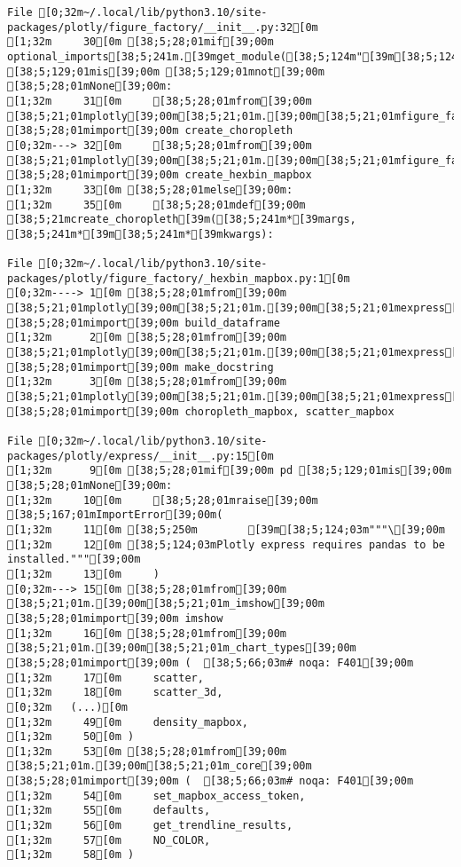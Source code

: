 \documentclass[
  a4paper,
  portrait]{book}
\begin{document}
\begin{verbatim}
File [0;32m~/.local/lib/python3.10/site-packages/plotly/figure_factory/__init__.py:32[0m
[1;32m     30[0m [38;5;28;01mif[39;00m optional_imports[38;5;241m.[39mget_module([38;5;124m"[39m[38;5;124mpandas[39m[38;5;124m"[39m) [38;5;129;01mis[39;00m [38;5;129;01mnot[39;00m [38;5;28;01mNone[39;00m:
[1;32m     31[0m     [38;5;28;01mfrom[39;00m [38;5;21;01mplotly[39;00m[38;5;21;01m.[39;00m[38;5;21;01mfigure_factory[39;00m[38;5;21;01m.[39;00m[38;5;21;01m_county_choropleth[39;00m [38;5;28;01mimport[39;00m create_choropleth
[0;32m---> 32[0m     [38;5;28;01mfrom[39;00m [38;5;21;01mplotly[39;00m[38;5;21;01m.[39;00m[38;5;21;01mfigure_factory[39;00m[38;5;21;01m.[39;00m[38;5;21;01m_hexbin_mapbox[39;00m [38;5;28;01mimport[39;00m create_hexbin_mapbox
[1;32m     33[0m [38;5;28;01melse[39;00m:
[1;32m     35[0m     [38;5;28;01mdef[39;00m [38;5;21mcreate_choropleth[39m([38;5;241m*[39margs, [38;5;241m*[39m[38;5;241m*[39mkwargs):

File [0;32m~/.local/lib/python3.10/site-packages/plotly/figure_factory/_hexbin_mapbox.py:1[0m
[0;32m----> 1[0m [38;5;28;01mfrom[39;00m [38;5;21;01mplotly[39;00m[38;5;21;01m.[39;00m[38;5;21;01mexpress[39;00m[38;5;21;01m.[39;00m[38;5;21;01m_core[39;00m [38;5;28;01mimport[39;00m build_dataframe
[1;32m      2[0m [38;5;28;01mfrom[39;00m [38;5;21;01mplotly[39;00m[38;5;21;01m.[39;00m[38;5;21;01mexpress[39;00m[38;5;21;01m.[39;00m[38;5;21;01m_doc[39;00m [38;5;28;01mimport[39;00m make_docstring
[1;32m      3[0m [38;5;28;01mfrom[39;00m [38;5;21;01mplotly[39;00m[38;5;21;01m.[39;00m[38;5;21;01mexpress[39;00m[38;5;21;01m.[39;00m[38;5;21;01m_chart_types[39;00m [38;5;28;01mimport[39;00m choropleth_mapbox, scatter_mapbox

File [0;32m~/.local/lib/python3.10/site-packages/plotly/express/__init__.py:15[0m
[1;32m      9[0m [38;5;28;01mif[39;00m pd [38;5;129;01mis[39;00m [38;5;28;01mNone[39;00m:
[1;32m     10[0m     [38;5;28;01mraise[39;00m [38;5;167;01mImportError[39;00m(
[1;32m     11[0m [38;5;250m        [39m[38;5;124;03m"""\[39;00m
[1;32m     12[0m [38;5;124;03mPlotly express requires pandas to be installed."""[39;00m
[1;32m     13[0m     )
[0;32m---> 15[0m [38;5;28;01mfrom[39;00m [38;5;21;01m.[39;00m[38;5;21;01m_imshow[39;00m [38;5;28;01mimport[39;00m imshow
[1;32m     16[0m [38;5;28;01mfrom[39;00m [38;5;21;01m.[39;00m[38;5;21;01m_chart_types[39;00m [38;5;28;01mimport[39;00m (  [38;5;66;03m# noqa: F401[39;00m
[1;32m     17[0m     scatter,
[1;32m     18[0m     scatter_3d,
[0;32m   (...)[0m
[1;32m     49[0m     density_mapbox,
[1;32m     50[0m )
[1;32m     53[0m [38;5;28;01mfrom[39;00m [38;5;21;01m.[39;00m[38;5;21;01m_core[39;00m [38;5;28;01mimport[39;00m (  [38;5;66;03m# noqa: F401[39;00m
[1;32m     54[0m     set_mapbox_access_token,
[1;32m     55[0m     defaults,
[1;32m     56[0m     get_trendline_results,
[1;32m     57[0m     NO_COLOR,
[1;32m     58[0m )


\end{verbatim}
\end{document}
